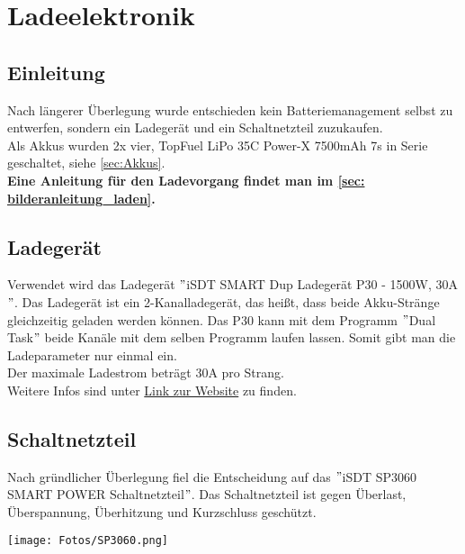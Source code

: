 \section{Ladeelektronik}
\subsection{Einleitung}
Nach längerer Überlegung wurde entschieden kein Batteriemanagement selbst zu entwerfen, sondern ein Ladegerät und ein Schaltnetzteil zuzukaufen. \\
Als Akkus wurden 2x vier, TopFuel LiPo 35C Power-X 7500mAh 7s in Serie geschaltet, siehe \ref{sec:Akkus}. \\

\textbf{Eine Anleitung für den Ladevorgang findet man im \autoref{sec: bilderanleitung_laden}.}

\subsection{Ladegerät}
Verwendet wird das Ladegerät $"$iSDT SMART Dup Ladegerät P30 - 1500W, 30A$"$. Das Ladegerät ist ein 2-Kanalladegerät, das heißt, 
dass beide Akku-Stränge gleichzeitig geladen werden können. 
Das P30 kann mit dem Programm $"$Dual Task$"$ beide Kanäle mit dem selben Programm laufen lassen. Somit gibt man die Ladeparameter nur einmal ein. \\
Der maximale Ladestrom beträgt 30$\mathrm{A}$ pro Strang. \\
Weitere Infos sind unter \href{https://www.modell-hubschrauber.at/Ladegeraete-Netzteile-Ladekabel-und-Zubehoer/Ladegeraete/Ladegeraete-12Volt/iSDT-SMART-Dup-Ladegeraet-P30-1500W-30A-8S-Lipo::43075.html}{Link zur Website} 
zu finden. 

\subsection{Schaltnetzteil}
Nach gründlicher Überlegung fiel die Entscheidung auf das $"$iSDT SP3060 SMART POWER Schaltnetzteil$"$.
Das Schaltnetzteil ist gegen Überlast, Überspannung, Überhitzung und Kurzschluss geschützt. 

\begin{minipage}{13cm}
    \centering
    \texttt{[image: Fotos/SP3060.png]}
\end{minipage}

\newpage

